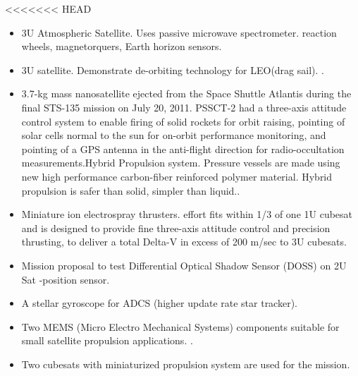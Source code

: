 <<<<<<< HEAD
%
%
%
%
%

\begin{itemize}
\item 3U Atmospheric Satellite. Uses passive microwave spectrometer.  reaction wheels, magnetorquers, Earth horizon sensors\cite{Ref:Blackwell12}. 

\item 3U satellite. Demonstrate de-orbiting technology for LEO(drag sail). \cite{Ref:Shmuel12}. 

\item 3.7-kg mass nanosatellite ejected from the Space Shuttle Atlantis during the final STS-135 mission on July 20, 2011. PSSCT-2 had a three-axis attitude control system to enable firing of solid rockets for orbit raising, pointing of solar cells normal to the sun for on-orbit performance monitoring, and pointing of a GPS antenna in the anti-flight direction for radio-occultation measurements.Hybrid Propulsion system. Pressure vessels are made using new high performance carbon-fiber reinforced polymer material. Hybrid propulsion is safer than solid, simpler than liquid.\cite{Ref:Janson12}.

\item Miniature ion electrospray thrusters. effort fits within 1/3 of one 1U cubesat and is designed to provide fine three-axis attitude control and precision thrusting, to deliver a total Delta-V in excess of 200 m/sec to 3U cubesats\cite{Ref:Dushku12}. 

\item Mission proposal to test Differential Optical Shadow Sensor (DOSS) on 2U Sat   -position sensor\cite{Ref:Martel12}. 

\item A stellar gyroscope for ADCS (higher update rate star tracker)\cite{Ref:Zoellner12}. 

\item Two MEMS (Micro Electro Mechanical Systems) components suitable for small satellite propulsion applications. \cite{Ref:Rawashdeh12}. 
\item Two cubesats with miniaturized propulsion system are used for the mission\cite{Ref:Sundaramoorthy10}. 


\end{itemize}
